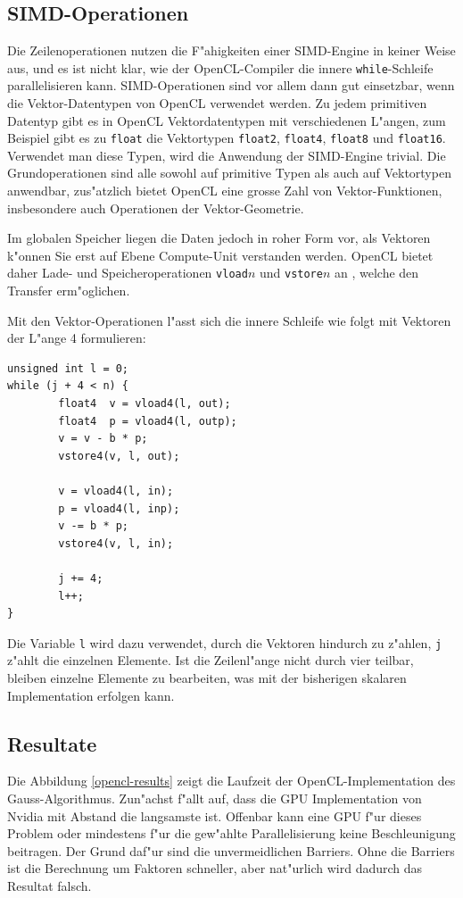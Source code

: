 \subsection{SIMD-Operationen}
Die Zeilenoperationen nutzen die F"ahigkeiten einer SIMD-Engine in keiner
Weise aus, und es ist nicht klar, wie der OpenCL-Compiler die innere
{\tt while}-Schleife parallelisieren kann. 
SIMD-Operationen sind vor allem dann gut einsetzbar, wenn die Vektor-Datentypen
von OpenCL verwendet werden.
Zu jedem primitiven Datentyp gibt es in OpenCL Vektordatentypen mit
verschiedenen L"angen,
zum Beispiel gibt es zu {\tt float} die Vektortypen {\tt float2},
{\tt float4}, {\tt float8}  und {\tt float16}.
Verwendet man diese Typen, wird die Anwendung der SIMD-Engine trivial.
Die Grundoperationen sind alle sowohl auf primitive Typen als auch auf
Vektortypen anwendbar, zus"atzlich bietet OpenCL eine grosse Zahl von
Vektor-Funktionen, insbesondere auch Operationen der Vektor-Geometrie.

Im globalen Speicher liegen die Daten jedoch in roher Form vor, als Vektoren
k"onnen Sie erst auf Ebene Compute-Unit verstanden werden.
OpenCL bietet daher Lade- und Speicheroperationen {\tt vload}$n$ und
{\tt vstore}$n$ an , welche den Transfer erm"oglichen.

Mit den Vektor-Operationen l"asst sich die innere Schleife wie folgt
mit Vektoren der L"ange 4 formulieren:
\begin{verbatim}
unsigned int l = 0;
while (j + 4 < n) {
        float4  v = vload4(l, out);
        float4  p = vload4(l, outp);
        v = v - b * p;
        vstore4(v, l, out);

        v = vload4(l, in);
        p = vload4(l, inp);
        v -= b * p;
        vstore4(v, l, in);

        j += 4;
        l++;
}
\end{verbatim}
Die Variable {\tt l} wird dazu verwendet, durch die Vektoren hindurch zu
z"ahlen, {\tt j} z"ahlt die einzelnen Elemente.
Ist die Zeilenl"ange nicht durch vier teilbar, bleiben einzelne 
Elemente zu bearbeiten, was mit der bisherigen skalaren Implementation
erfolgen kann.

\subsection{Resultate}
Die Abbildung \ref{opencl-results} zeigt die Laufzeit der OpenCL-Implementation
des Gauss-Algorithmus. Zun"achst f"allt auf, dass die GPU Implementation
von Nvidia mit Abstand die langsamste ist.
Offenbar kann eine GPU f"ur dieses Problem oder mindestens f"ur die
gew"ahlte Parallelisierung keine Beschleunigung beitragen.
Der Grund daf"ur sind die unvermeidlichen Barriers.
Ohne die Barriers ist die Berechnung um Faktoren schneller, aber nat"urlich
wird dadurch das Resultat falsch.

